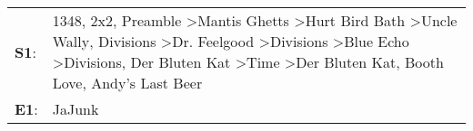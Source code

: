 \begin{supertabular}{p{0.03\textwidth}p{0.92\textwidth}}
 \textbf{S1}:  &  1348\textsuperscript{}, \enspace 2x2\textsuperscript{}, \enspace Preamble\textsuperscript{} \textgreater \enspace Mantis Ghetts\textsuperscript{} \textgreater \enspace Hurt Bird Bath\textsuperscript{} \textgreater \enspace Uncle Wally\textsuperscript{}, \enspace Divisions\textsuperscript{} \textgreater \enspace Dr. Feelgood\textsuperscript{} \textgreater \enspace Divisions\textsuperscript{} \textgreater \enspace Blue Echo\textsuperscript{} \textgreater \enspace Divisions\textsuperscript{}, \enspace Der Bluten Kat\textsuperscript{} \textgreater \enspace Time\textsuperscript{} \textgreater \enspace Der Bluten Kat\textsuperscript{}, \enspace Booth Love\textsuperscript{}, \enspace Andy's Last Beer\textsuperscript{}  \enspace  \\
 \textbf{E1}:  &                                                                                                                                                                                                                                                                                                                                                                                                                                                                                                                                                                                                                                                                                                                          JaJunk\textsuperscript{}  \enspace  \\
\end{supertabular}
